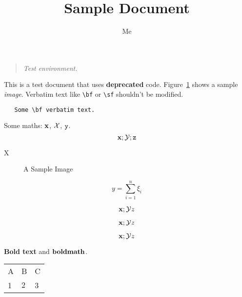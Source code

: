 \documentclass[12pt,a4paper]{article}
\title{Sample Document}
\author{Me}
\newcommand{\boldstuff}[1]{{\bf #1}}
\newenvironment{itquote}{\begin{quotation}\itshape}{\end{quotation}}
\begin{document}
\maketitle

\begin{itquote}
Test environment.
\end{itquote}

This is a test {\sf document} that uses {\bf  deprecated} code.
Figure~\ref{fig:sample} shows a sample {\it image}.
  Verbatim text like \verb|\bf| or \verb|\sf| shouldn't be
modified. 
\begin{verbatim}
   Some \bf verbatim text.
\end{verbatim}

Some maths: $\bf x$, \begin{math}\cal X\end{math},
\(\tt y\).
\[
  {\bf x}; {\cal Y}; {\tt z}
\]

   \centerline{X}

\begin{figure}
\centerline{}
\caption{A Sample Image}
\label{fig:sample}
\end{figure}

$$y = \sum_{i=1}^n \xi_i$$

$${\bf x}; {\cal Y} {\it z}$$

\begin{displaymath}
{\bf x}; {\cal Y} {\it z}
\end{displaymath}

\begin{equation}
{\bf x}; {\cal Y} {\it z}
\end{equation}

\boldstuff{Bold text} and $\boldstuff{bold math}$.

\begin{table}
{\begin{tabular}{lll}
 A & B & C\\
 1 & $2$ & 3
 \end{tabular}
}
\end{table}
\end{document}
